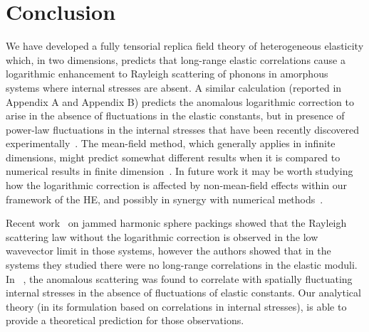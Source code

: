 \documentclass[twoside,twocolumn,9pt]{article}
\begin{document}

\section{Conclusion}
We have developed a fully tensorial replica field theory of heterogeneous elasticity which, in two dimensions, predicts that long-range elastic correlations cause a logarithmic enhancement to Rayleigh scattering of phonons in amorphous systems where internal stresses are absent. A similar calculation (reported in Appendix A and Appendix B) predicts the anomalous logarithmic correction to arise in the absence of fluctuations in the elastic constants, but in presence of power-law fluctuations in the internal stresses that have been recently discovered experimentally~\cite{Jie2020}. The mean-field method, which generally applies in infinite dimensions, might predict somewhat different results when it is compared to numerical results in finite dimension~\cite{Shimada2019}. In future work it may be worth studying how the logarithmic correction is affected by non-mean-field
effects within our framework of the HE, and possibly in synergy with numerical methods~\cite{Shimada2019}.

Recent work~\cite{Mizuno2018} on jammed harmonic sphere packings showed that the Rayleigh scattering law without the logarithmic correction is observed in the low wavevector limit in those systems, however the authors showed that in the systems they studied there were no long-range correlations in the elastic moduli. In ~\cite{Moriel2019}, the anomalous scattering was found to correlate with spatially fluctuating internal stresses in the absence of fluctuations of elastic constants.
Our analytical theory (in its formulation based on correlations in internal stresses), is able to provide a theoretical prediction for those observations.
\end{document}
